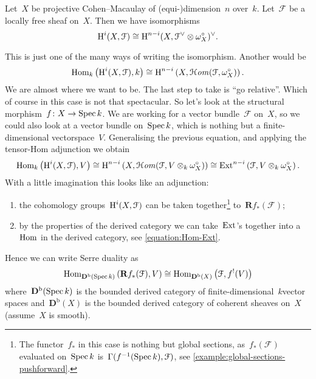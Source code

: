 \begin{corollary}
  Let~$X$ be projective Cohen--Macaulay of (equi-)dimension~$n$ over~$k$. Let~$\mathcal{F}$ be a locally free sheaf on~$X$. Then we have isomorphisms
  \begin{equation}
    \operatorname{H}^i(X,\mathcal{F})\cong\operatorname{H}^{n-i}(X,\mathcal{F}^\vee\otimes\omega_X^\circ)^\vee.
  \end{equation}
\end{corollary}
This is just one of the many ways of writing the isomorphism. Another would be
\begin{equation}
  \operatorname{Hom}_k\left( \operatorname{H}^i(X,\mathcal{F}),k \right)\cong\operatorname{H}^{n-i}\left( X,\operatorname{\mathcal{H}\mathit{om}}(\mathcal{F},\omega_X^\circ) \right).
\end{equation}
We are almost where we want to be. The last step to take is ``go relative''. Which of course in this case is not that spectacular. So let's look at the structural morphism~$f\colon X\to\operatorname{Spec} k$. We are working for a vector bundle~$\mathcal{F}$ on~$X$, so we could also look at a vector bundle on~$\operatorname{Spec} k$, which is nothing but a finite-dimensional vectorspace~$V$. Generalising the previous equation, and applying the tensor-Hom adjunction we obtain
\begin{equation}
  \operatorname{Hom}_k\left( \operatorname{H}^i(X,\mathcal{F}),V \right)\cong\operatorname{H}^{n-i}\left( X,\operatorname{\mathcal{H}\mathit{om}}(\mathcal{F},V\otimes_k\omega_X^\circ) \right)\cong\operatorname{Ext}^{n-i}\left( \mathcal{F},V\otimes_k\omega_X^\circ \right).
\end{equation}
With a little imagination this looks like an adjunction:
\begin{enumerate}
  \item the cohomology groups~$\operatorname{H}^i(X,\mathcal{F})$ can be taken together\footnote{The functor~$f_*$ in this case is nothing but global sections, as~$f_*(\mathcal{F})$ evaluated on~$\operatorname{Spec} k$ is~$\Gamma(f^{-1}(\operatorname{Spec} k),\mathcal{F})$, see \cref{example:global-sections-pushforward}.} to~$\mathbf{R}f_*(\mathcal{F})$;
  \item by the properties of the derived category we can take~$\operatorname{Ext}$'s together into a~$\operatorname{Hom}$ in the derived category, see \eqref{equation:Hom-Ext}.
\end{enumerate}
Hence we can write Serre duality as
\begin{equation}
  \operatorname{Hom}_{\mathbf{D}^{\mathrm{b}}(\operatorname{Spec} k)}\left( \mathbf{R}f_*(\mathcal{F}),V \right)\cong\operatorname{Hom}_{\mathbf{D}^{\mathrm{b}}(X)}\left( \mathcal{F},f^!(V) \right)
\end{equation}
where~$\mathbf{D}^{\mathrm{b}}(\operatorname{Spec} k)$ is the bounded derived category of finite-dimensional~$k$\dash vector spaces and~$\mathbf{D}^{\mathrm{b}}(X)$ is the bounded derived category of coherent sheaves on~$X$ (assume~$X$ is smooth).

